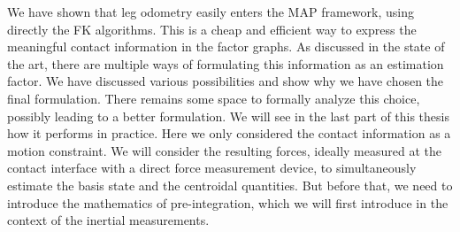 We have shown that leg odometry easily enters the MAP framework, using directly
the FK algorithms. This is a cheap and efficient way to express the meaningful contact
information in the factor graphs. As discussed in the state of the art, there are multiple
ways of formulating this information as an estimation factor. We have discussed
various possibilities and show why we have chosen the final formulation. There remains
some space to formally analyze this choice, possibly leading to a better formulation.
We will see in the last part of this thesis how it performs in practice.
Here we only considered the contact information as a motion constraint. We will
consider the resulting forces, ideally measured at the contact interface with a direct
force measurement device, to simultaneously estimate the basis state and the centroidal
quantities. But before that, we need to introduce the mathematics of pre-integration,
which we will first introduce in the context of the inertial measurements.
